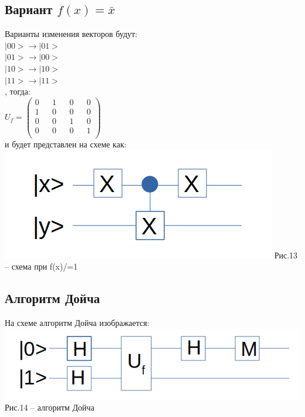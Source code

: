 \documentclass[11pt]{report}
\begin{document}
\subsection{Вариант $f(x) = \bar{x} $}
Варианты изменения векторов будут: \\

$|00> \rightarrow |01> $ \\

$|01> \rightarrow |00> $ \\

$|10> \rightarrow |10> $ \\

$|11> \rightarrow |11> $ \\

, тогда: \\

$U_f = \begin{pmatrix}
0 && 1 && 0 && 0 \\
1 && 0 && 0 && 0 \\
0 && 0 && 1 && 0 \\
0 && 0 && 0 && 1 \\
\end{pmatrix}$ \\

и будет представлен на схеме как: \\

\includegraphics[scale=0.3]{f_not_x}
Рис.13 -- схема при f(x)/=1\\

\subsection{Алгоритм Дойча}
На схеме алгоритм Дойча изображается: \\

\includegraphics[scale=0.3]{doych}\\
Рис.14 -- алгоритм Дойча\\
\end{document}
